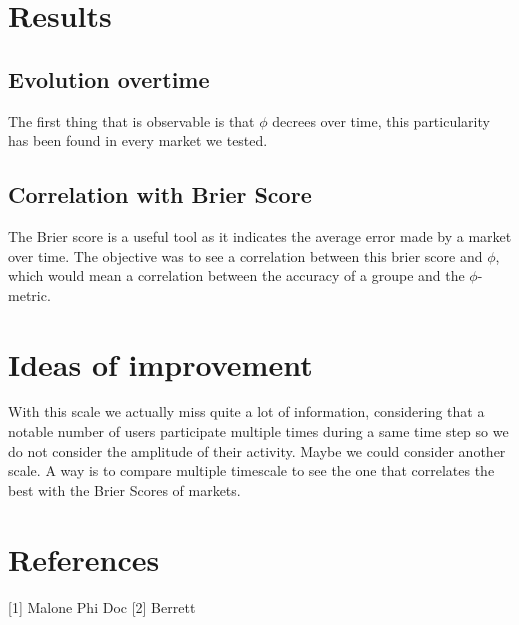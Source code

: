\documentclass{report}
\begin{document}
\chapter{Results}
\section{Evolution overtime}

The first thing that is observable is that $\phi $ decrees over time, this particularity has been found in every market we tested.


\section{Correlation with Brier Score}

The Brier score is a useful tool as it indicates the average error made by a market over time. The objective was to see a correlation between this brier score and $\phi $, which would mean a correlation between the accuracy of a groupe and the $\phi $-metric.


\chapter{Ideas of improvement}

With this scale we actually miss quite a lot of information, considering that a notable number of users participate multiple times during a same time step so we do not consider the amplitude of their activity. Maybe we could consider another scale. A way is to compare multiple timescale to see the one that correlates the best with the Brier Scores of markets.



\chapter{References}

[1] Malone Phi Doc
[2] Berrett 






\tableofcontents
 
\end{document}
